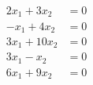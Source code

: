\begin{align*}
2x_1  + 3x_2  &= 0\\
-x_1 + 4x_2  &=  0 \\
3x_1 +10x_2  &=  0  \\
3x_1 - x_2  &=  0  \\
6x_1 + 9x_2  &=  0  
\end{align*}